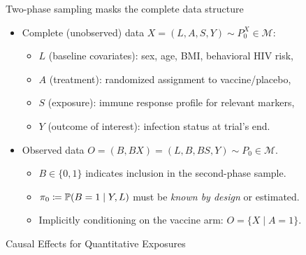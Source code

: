 \documentclass{beamer}
\begin{document}
\begin{frame}[c]{Two-phase sampling masks the complete data structure}

\begin{center}
\begin{itemize}
  \itemsep8pt
  \item Complete (unobserved) data $X = (L, A, S, Y) \sim P_0^X \in
    \mathcal{M}$:
    \begin{itemize}
      \itemsep4pt
      \item $L$ (baseline covariates): sex, age, BMI, behavioral HIV risk,
      \item $A$ (treatment): randomized assignment to vaccine/placebo,
      \item $S$ (exposure): immune response profile for relevant markers,
      \item $Y$ (outcome of interest): infection status at trial's end.
    \end{itemize}
  \item Observed data $O = (B, BX) = (L, B, BS, Y) \sim P_0 \in \mathcal{M}$.
    \begin{itemize}
      \itemsep4pt
      \item $B \in \{0,1\}$ indicates inclusion in the second-phase sample.
      \item $\pi_0 \coloneqq \mathbb{P}(B = 1 \mid Y, L)$ must be \textit{known by
        design} or estimated.
      \item Implicitly conditioning on the vaccine arm: $O = \{X \mid A = 1\}$.
    \end{itemize}
\end{itemize}
\end{center}

\note{
}

\end{frame}


\begin{frame}[standout]
  Causal Effects for Quantitative Exposures
\end{frame}

\end{document}
